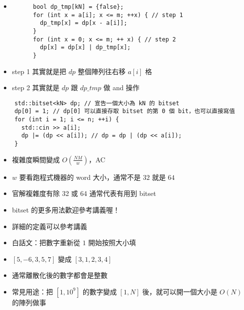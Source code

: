 \documentclass[standalone]{beamer}
\begin{document}
\begin{frame}[fragile]{}
  \begin{itemize}
    \item
    \begin{verbatim}
      bool dp_tmp[kN] = {false};
      for (int x = a[i]; x <= m; ++x) { // step 1
        dp_tmp[x] = dp[x - a[i]];
      }
      for (int x = 0; x <= m; ++ x) { // step 2
        dp[x] = dp[x] | dp_tmp[x];
      }
    \end{verbatim}
    \item step 1 其實就是把 $dp$ 整個陣列往右移 $a[i]$ 格
    \item step 2 其實就是 $dp$ 跟 $dp\_tmp$ 做 and 操作
  \end{itemize}
\end{frame}

\begin{frame}[fragile]{}
  \begin{verbatim}
    std::bitset<kN> dp; // 宣告一個大小為 kN 的 bitset
    dp[0] = 1; // dp[0] 可以直接存取 bitset 的第 0 個 bit，也可以直接寫值
    for (int i = 1; i <= n; ++i) {
      std::cin >> a[i];
      dp |= (dp << a[i]); // dp = dp | (dp << a[i]);
    }
  \end{verbatim}
\end{frame}

\begin{frame}{}
  \begin{itemize}
    \item 複雜度瞬間變成 $O(\frac{NM}{w})$，AC
    \item $w$ 要看跑程式機器的 word 大小，通常不是 $32$ 就是 $64$
    \item 官解複雜度有除 32 或 64 通常代表有用到 bitset
    \item bitset 的更多用法歡迎參考講義喔！
  \end{itemize}
\end{frame}

\begin{frame}{}
  \begin{itemize}
    \item 詳細的定義可以參考講義
    \item 白話文：把數字重新從 $1$ 開始按照大小填
    \item $[5, -6, 3, 5, 7]$ 變成 $[3, 1, 2, 3, 4]$
    \item 通常離散化後的數字都會是整數
    \item 常見用途：把 $[1, 10^9]$ 的數字變成 $[1, N]$ 後，就可以開一個大小是 $O(N)$ 的陣列做事
  \end{itemize}
\end{frame}
\end{document}
